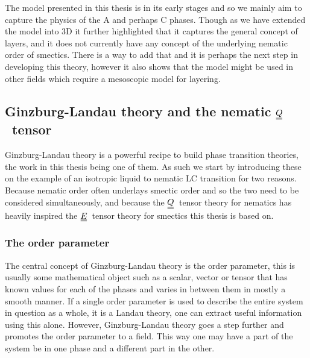 \documentclass[12pt]{article}
\newcommand{\duf}[2]{\stackunder[0.5pt]{\stackunder[0.8pt]{\stackunder[1pt]{\ensuremath{#1}}{\rule{\widthof{\ensuremath{#2}}*\real{0.9}}{.1ex}}}{\rule{\widthof{\ensuremath{#2}}*\real{0.9}}{.1ex}}}{}}
\newcommand{\du}[1]{\duf{#1}{#1}}
\newcommand{\QQ}{\ensuremath{\du{Q}}}
\newcommand{\EE}{\ensuremath{\du{E}}}
\begin{document}

    The model presented in this thesis is in its early stages and so we mainly aim to capture the physics of the A and perhaps C phases.
    Though as we have extended the model into 3D it further highlighted that it captures the general concept of layers, and it does not currently have any concept of the underlying nematic order of smectics.
    There is a way to add that and it is perhaps the next step in developing this theory, however it also shows that the model might be used in other fields which require a mesoscopic model for layering.

    \subsection{Ginzburg-Landau theory and the nematic \QQ\ tensor}\label{sec:intro_GL_nem}
        Ginzburg-Landau theory is a powerful recipe to build phase transition theories, the work in this thesis being one of them.
        As such we start by introducing these on the example of an isotropic liquid to nematic LC transition for two reasons.
        Because nematic order often underlays smectic order and so the two need to be considered simultaneously, and because the \QQ\ tensor theory for nematics has heavily inspired the \EE\ tensor theory for smectics this thesis is based on.

        \subsubsection{The order parameter}\label{sec:intro_Q}
        The central concept of Ginzburg-Landau theory is the order parameter, this is usually some mathematical object such as a scalar, vector or tensor that has known values for each of the phases and varies in between them in mostly a smooth manner.
        If a single order parameter is used to describe the entire system in question as a whole, it is a Landau theory, one can extract useful information using this alone.
        However, Ginzburg-Landau theory goes a step further and promotes the order parameter to a field.
        This way one may have a part of the system be in one phase and a different part in the other.
\end{document}
